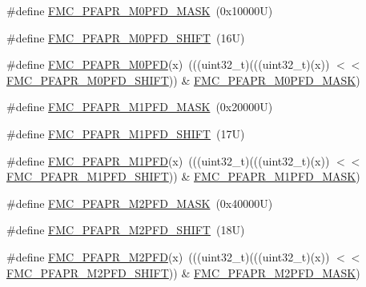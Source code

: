 \begin{DoxyCompactItemize}
\item 
\#define \mbox{\hyperlink{group___f_m_c___register___masks_ga5f6efa8c02f2a2f04d5b62f8de35e9a9}{F\+M\+C\+\_\+\+P\+F\+A\+P\+R\+\_\+\+M0\+P\+F\+D\+\_\+\+M\+A\+SK}}~(0x10000\+U)
\item 
\#define \mbox{\hyperlink{group___f_m_c___register___masks_ga5d7609bb54910d8b7be4dc3b868c040c}{F\+M\+C\+\_\+\+P\+F\+A\+P\+R\+\_\+\+M0\+P\+F\+D\+\_\+\+S\+H\+I\+FT}}~(16\+U)
\item 
\#define \mbox{\hyperlink{group___f_m_c___register___masks_gab54c300418c80f8c0a8d4a67895c99f9}{F\+M\+C\+\_\+\+P\+F\+A\+P\+R\+\_\+\+M0\+P\+FD}}(x)~(((uint32\+\_\+t)(((uint32\+\_\+t)(x)) $<$$<$ \mbox{\hyperlink{group___f_m_c___register___masks_ga5d7609bb54910d8b7be4dc3b868c040c}{F\+M\+C\+\_\+\+P\+F\+A\+P\+R\+\_\+\+M0\+P\+F\+D\+\_\+\+S\+H\+I\+FT}})) \& \mbox{\hyperlink{group___f_m_c___register___masks_ga5f6efa8c02f2a2f04d5b62f8de35e9a9}{F\+M\+C\+\_\+\+P\+F\+A\+P\+R\+\_\+\+M0\+P\+F\+D\+\_\+\+M\+A\+SK}})
\item 
\#define \mbox{\hyperlink{group___f_m_c___register___masks_ga3288aee0551874c34ce18211489a5f74}{F\+M\+C\+\_\+\+P\+F\+A\+P\+R\+\_\+\+M1\+P\+F\+D\+\_\+\+M\+A\+SK}}~(0x20000\+U)
\item 
\#define \mbox{\hyperlink{group___f_m_c___register___masks_gaf51c3aa2255cc9c8efe5c2a705593f8f}{F\+M\+C\+\_\+\+P\+F\+A\+P\+R\+\_\+\+M1\+P\+F\+D\+\_\+\+S\+H\+I\+FT}}~(17\+U)
\item 
\#define \mbox{\hyperlink{group___f_m_c___register___masks_ga13ec188ae626381ef51240795e79e578}{F\+M\+C\+\_\+\+P\+F\+A\+P\+R\+\_\+\+M1\+P\+FD}}(x)~(((uint32\+\_\+t)(((uint32\+\_\+t)(x)) $<$$<$ \mbox{\hyperlink{group___f_m_c___register___masks_gaf51c3aa2255cc9c8efe5c2a705593f8f}{F\+M\+C\+\_\+\+P\+F\+A\+P\+R\+\_\+\+M1\+P\+F\+D\+\_\+\+S\+H\+I\+FT}})) \& \mbox{\hyperlink{group___f_m_c___register___masks_ga3288aee0551874c34ce18211489a5f74}{F\+M\+C\+\_\+\+P\+F\+A\+P\+R\+\_\+\+M1\+P\+F\+D\+\_\+\+M\+A\+SK}})
\item 
\#define \mbox{\hyperlink{group___f_m_c___register___masks_ga25320b4377f5b7137bece86c278122a4}{F\+M\+C\+\_\+\+P\+F\+A\+P\+R\+\_\+\+M2\+P\+F\+D\+\_\+\+M\+A\+SK}}~(0x40000\+U)
\item 
\#define \mbox{\hyperlink{group___f_m_c___register___masks_ga52792f2b60fa3fef0d38b172867adfe9}{F\+M\+C\+\_\+\+P\+F\+A\+P\+R\+\_\+\+M2\+P\+F\+D\+\_\+\+S\+H\+I\+FT}}~(18\+U)
\item 
\#define \mbox{\hyperlink{group___f_m_c___register___masks_ga3c5604b06e0733bd2f23b70524a6f62e}{F\+M\+C\+\_\+\+P\+F\+A\+P\+R\+\_\+\+M2\+P\+FD}}(x)~(((uint32\+\_\+t)(((uint32\+\_\+t)(x)) $<$$<$ \mbox{\hyperlink{group___f_m_c___register___masks_ga52792f2b60fa3fef0d38b172867adfe9}{F\+M\+C\+\_\+\+P\+F\+A\+P\+R\+\_\+\+M2\+P\+F\+D\+\_\+\+S\+H\+I\+FT}})) \& \mbox{\hyperlink{group___f_m_c___register___masks_ga25320b4377f5b7137bece86c278122a4}{F\+M\+C\+\_\+\+P\+F\+A\+P\+R\+\_\+\+M2\+P\+F\+D\+\_\+\+M\+A\+SK}})
$$
\end{DoxyCompactItemize}
